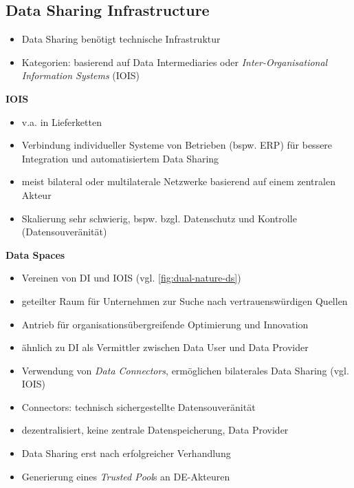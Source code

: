 \subsection{Data Sharing Infrastructure}

\begin{itemize}
    \item Data Sharing benötigt technische Infrastruktur
    \item Kategorien: basierend auf Data Intermediaries oder \emph{Inter-Organisational Information Systems} (IOIS)
\end{itemize}

\vspace{1em}

\textbf{IOIS}
\begin{itemize}
    \item v.a. in Lieferketten
    \item Verbindung individueller Systeme von Betrieben (bspw. ERP) für bessere Integration und automatisiertem Data Sharing
    \item meist bilateral oder multilaterale Netzwerke basierend auf einem zentralen Akteur
    \item Skalierung sehr schwierig, bspw. bzgl. Datenschutz und Kontrolle (Datensouveränität)
\end{itemize}

\vspace{1em}

\textbf{Data Spaces}
\begin{itemize}
    \item Vereinen von DI und IOIS (vgl. \autoref{fig:dual-nature-ds})
    \item geteilter Raum für Unternehmen zur Suche nach vertrauenswürdigen Quellen
    \item Antrieb für organisationsübergreifende Optimierung und Innovation
    \item ähnlich zu DI als Vermittler zwischen Data User und Data Provider
    \item Verwendung von \emph{Data Connectors}, ermöglichen bilaterales Data Sharing (vgl. IOIS)
    \item Connectors: technisch sichergestellte Datensouveränität
    \item dezentralisiert, keine zentrale Datenspeicherung, Data Provider
    \item Data Sharing erst nach erfolgreicher Verhandlung
    \item Generierung eines \emph{Trusted Pool}s an DE-Akteuren~\cite{mollerIndustrialDataEcosystems2024}
\end{itemize}

